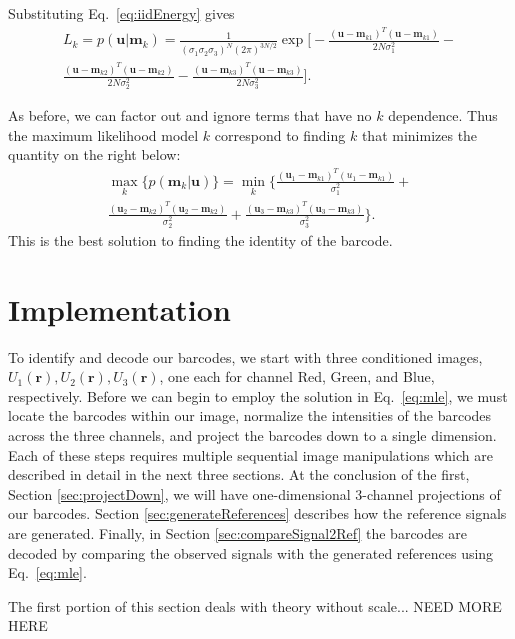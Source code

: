 Substituting Eq.~\ref{eq:iidEnergy} gives
\begin{multline}
L_k=p(\mathbf{u}|\mathbf{m}_k) =\frac{1}{ (\sigma_1\sigma_2\sigma_3)^N  (2\pi)^{3N/2}  }  \exp\Bigg[ -\frac{(\mathbf{u}-\mathbf{m}_{k1})^T(\mathbf{u}-\mathbf{m}_{k1})} {2 N \sigma_1^2 }   - \\ \frac{(\mathbf{u}-\mathbf{m}_{k2})^T(\mathbf{u}-\mathbf{m}_{k2})} {2 N \sigma_2^2 } -\frac{(\mathbf{u}-\mathbf{m}_{k3})^T(\mathbf{u}-\mathbf{m}_{k3})} {2 N \sigma_3^2 }    \Bigg].
\end{multline}

As before, we can factor out and ignore terms that have no $k$ dependence. Thus the maximum likelihood model $k$ correspond to finding $k$ that minimizes the quantity on the right below:
\begin{multline}\label{eq:mle}
\max_k   \big\{ p(\mathbf{m}_k|\mathbf{u}) \big\} =  \min_k  \Bigg\{  \frac{(\mathbf{u}_1-\mathbf{m}_{k1})^T(u_1-\mathbf{m}_{k1})}{\sigma_1^2} +\\  
\frac{(\mathbf{u}_2-\mathbf{m}_{k2})^T(\mathbf{u}_2-\mathbf{m}_{k2})}{\sigma_2^2} + \frac{(\mathbf{u}_3-\mathbf{m}_{k3})^T(\mathbf{u}_3-\mathbf{m}_{k3})}{\sigma_3^2} \Bigg\}. 
\end{multline}
This is the best solution to finding the identity of the barcode.

\section{Implementation}
To identify and decode our barcodes, we start with three conditioned images, $U_1(\mathbf{r}), U_2(\mathbf{r}), U_3(\mathbf{r})$, one each for channel Red, Green, and Blue, respectively.  Before we can begin to employ the solution in Eq.~\ref{eq:mle}, we must locate the barcodes within our image, normalize the intensities of the barcodes across the three channels, and project the barcodes down to a single dimension. Each of these steps requires multiple sequential image manipulations which are described in detail in the next three sections. At the conclusion of the first, Section \ref{sec:projectDown}, we will  have one-dimensional 3-channel projections of our barcodes. Section \ref{sec:generateReferences} describes how the reference signals are generated. Finally, in Section \ref{sec:compareSignal2Ref} the barcodes are decoded by comparing the observed signals with the generated references  using Eq.~\ref{eq:mle}.

The first  portion of this section deals with theory without scale... NEED MORE HERE

